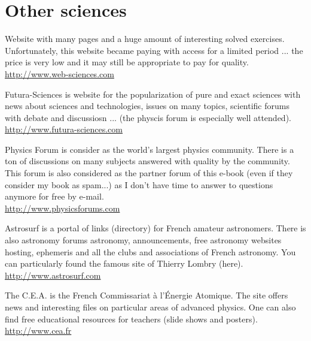 	\pagebreak
	\section{Other sciences}

	{\Large {}}{\Large {}}{\Large {}}{\Large {}}\bcdfrance{} Website with many pages and a huge amount of interesting solved exercises. Unfortunately, this website became paying with access for a limited period ... the price is very low and it may still be appropriate to pay for quality.\\
	\href{http://www.web-sciences.com}{\color{blue}http://www.web-sciences.com}
	
	{\Large {}}{\Large {}}{\Large {}}{\Large {}}{\Large {}}\bcdfrance{} Futura-Sciences is website for the popularization of pure and exact sciences with news about sciences and technologies, issues on many topics, scientific forums with debate and discussiosn ... (the physcis forum is especially well attended).\\
	\href{http://www.futura-sciences.com}{\color{blue}http://www.futura-sciences.com}
	
	{\Large {}}{\Large {}}{\Large {}}{\Large {}}{\Large {}}\bcdfrance{} Physics Forum is consider as the world's largest physics community. There is a ton of discussions on many subjects answered with quality by the community. This forum is also considered as the partner forum of this e-book (even if they consider my book as spam...) as I don't have time to answer to questions anymore for free by e-mail. \\
	\href{http://www.physicsforums.com}{\color{blue}http://www.physicsforums.com}
	
	{\Large {}}{\Large {}}{\Large {}}{\Large {}}{\Large {}}{\Large {}}{\Large {}}{\Large {}}\bcdfrance{} Astrosurf is a portal of links (directory) for French amateur astronomers. There is also astronomy forums astronomy, announcements, free astronomy websites hosting, ephemeris and all the clubs and associations of French astronomy. You can particularly found the famous site of Thierry Lombry (here).\\
	\href{http://www.astrosurf.com}{\color{blue}http://www.astrosurf.com}
	
	{\Large {}}{\Large {}} The C.E.A. is the French Commissariat à l'Énergie Atomique. The site offers news and interesting files on particular areas of advanced physics. One can also find free educational resources for teachers (slide shows and posters).\\
	\href{http://www.cea.fr}{\color{blue}http://www.cea.fr}
	
